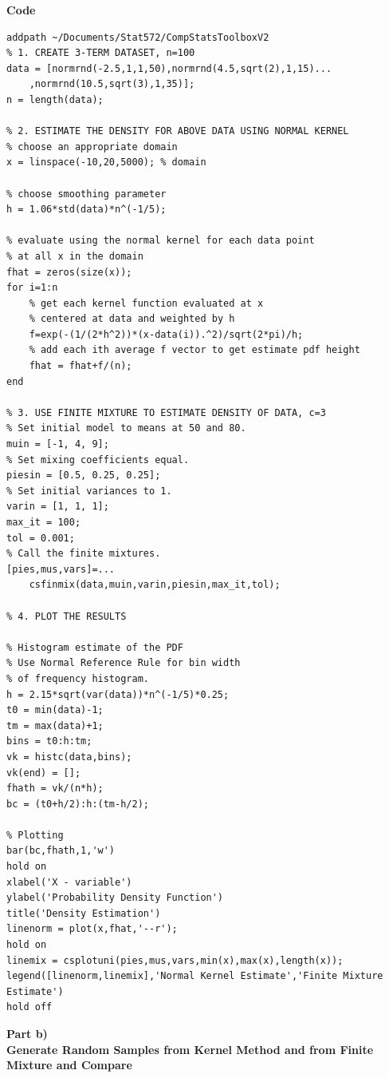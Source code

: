 \documentclass[12pt,a4paper]{article}
\begin{document}
\FloatBarrier
\textbf{Code}
\begin{verbatim}
addpath ~/Documents/Stat572/CompStatsToolboxV2
% 1. CREATE 3-TERM DATASET, n=100
data = [normrnd(-2.5,1,1,50),normrnd(4.5,sqrt(2),1,15)...
    ,normrnd(10.5,sqrt(3),1,35)];
n = length(data);

% 2. ESTIMATE THE DENSITY FOR ABOVE DATA USING NORMAL KERNEL
% choose an appropriate domain
x = linspace(-10,20,5000); % domain

% choose smoothing parameter
h = 1.06*std(data)*n^(-1/5); 

% evaluate using the normal kernel for each data point 
% at all x in the domain
fhat = zeros(size(x));
for i=1:n
    % get each kernel function evaluated at x
    % centered at data and weighted by h
    f=exp(-(1/(2*h^2))*(x-data(i)).^2)/sqrt(2*pi)/h;
    % add each ith average f vector to get estimate pdf height
    fhat = fhat+f/(n);
end

% 3. USE FINITE MIXTURE TO ESTIMATE DENSITY OF DATA, c=3
% Set initial model to means at 50 and 80.
muin = [-1, 4, 9];
% Set mixing coefficients equal.
piesin = [0.5, 0.25, 0.25];
% Set initial variances to 1.
varin = [1, 1, 1];
max_it = 100;
tol = 0.001;
% Call the finite mixtures.
[pies,mus,vars]=...
    csfinmix(data,muin,varin,piesin,max_it,tol);

% 4. PLOT THE RESULTS

% Histogram estimate of the PDF
% Use Normal Reference Rule for bin width
% of frequency histogram.
h = 2.15*sqrt(var(data))*n^(-1/5)*0.25;
t0 = min(data)-1;
tm = max(data)+1;
bins = t0:h:tm;
vk = histc(data,bins);
vk(end) = [];
fhath = vk/(n*h);
bc = (t0+h/2):h:(tm-h/2);

% Plotting
bar(bc,fhath,1,'w')
hold on
xlabel('X - variable')
ylabel('Probability Density Function')
title('Density Estimation')
linenorm = plot(x,fhat,'--r');
hold on
linemix = csplotuni(pies,mus,vars,min(x),max(x),length(x));
legend([linenorm,linemix],'Normal Kernel Estimate','Finite Mixture Estimate')
hold off
\end{verbatim}
\clearpage
\textbf{Part b)}\\
\textbf{Generate Random Samples from Kernel Method and from Finite Mixture and Compare}\\
\end{document}
